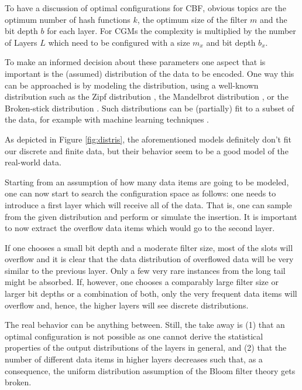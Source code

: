 \documentclass[sigconf, nonacm]{acmart}
\begin{document}
To have a discussion of optimal configurations for CBF, obvious topics are the optimum number of hash functions $k$, the optimum size of the filter $m$ and the bit depth $b$ for each layer. For CGMs the complexity is multiplied by the number of Layers $L$ which need to be configured with a size $m_x$ and bit depth $b_x$.

To make an informed decision about these parameters one aspect that is important is the (assumed) distribution of the data to be encoded. One way this can be approached is by modeling the distribution, using a well-known distribution such as the Zipf distribution \cite{zipf1945meaning}, the Mandelbrot distribution \cite{mandelbrot1967distribution}, or the Broken-stick distribution \cite{baumiller1992broken}. Such distributions can be (partially) fit to a subset of the data, for example with machine learning techniques \cite{pradoml}.

As depicted in Figure \ref{fig:distris}, the aforementioned models definitely don't fit our discrete and finite data, but their behavior seem to be a good model of the real-world data.

Starting from an assumption of how many data items are going to be modeled, one can now start to search the configuration space as follows: one needs to introduce a first layer which will receive all of the data. That is, one can sample from the given distribution and perform or simulate the insertion. It is important to now extract the overflow data items which would go to the second layer.

If one chooses a small bit depth and a moderate filter size, most of the slots will overflow and it is clear that the data distribution of overflowed data will be very similar to the previous layer. Only a few very rare instances from the long tail might be absorbed.
If, however, one chooses a comparably large filter size or larger bit depths or a combination of both, only the very frequent data items will overflow and, hence, the higher layers will see discrete distributions.

The real behavior can be anything between. Still, the take away is (1) that an optimal configuration is not possible as one cannot derive the statistical properties of the output distributions of the layers in general, and (2) that the number of different data items in higher layers decreases such that, as a consequence, the uniform distribution assumption of the Bloom filter theory gets broken.


\end{document}
